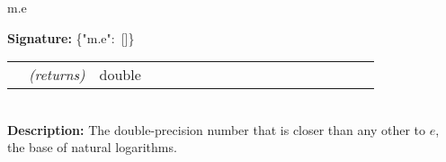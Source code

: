 {{    {m.e}{\hypertarget{m.e}{\noindent \mbox{\hspace{0.015\linewidth}} {\bf Signature:} \mbox{\PFAc \{"m.e":$\!$ []\} \vspace{0.2 cm} \\} \vspace{0.2 cm} \\ \rm \begin{tabular}{p{0.01\linewidth} l p{0.8\linewidth}} & {\it (returns)} & double \\  \end{tabular} \vspace{0.3 cm} \\ \mbox{\hspace{0.015\linewidth}} {\bf Description:} The double-precision number that is closer than any other to $e$, the base of natural logarithms. \vspace{0.2 cm} \\ }}%
}}
